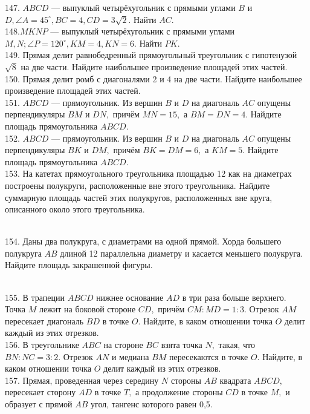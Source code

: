 147. $ABCD$ --- выпуклый четырёхугольник с прямыми углами $B$ и $D,\angle A=45^\circ, BC=4, CD=3\sqrt{2}.$ Найти $AC.$\\
148.$MKNP$ --- выпуклый четырёхугольник с прямыми углами $M, N; \angle P=120^\circ, KM=4, KN=6.$ Найти $PK.$\\
149. Прямая делит равнобедренный прямоугольный треугольник с гипотенузой $\sqrt{8}$ на две части. Найдите наибольшее произведение площадей этих частей.\\
150. Прямая делит ромб с диагоналями 2 и 4 на две части. Найдите наибольшее произведение площадей
этих частей.\\
151. $ABCD$ --- прямоугольник. Из вершин $B$ и $D$ на диагональ $AC$ опущены перпендикуляры $BM$ и $DN,$
причём $MN=15,$ а $BM=DN=4.$ Найдите площадь прямоугольника $ABCD.$\\
152. $ABCD$ --- прямоугольник. Из вершин $B$ и $D$ на диагональ $AC$ опущены перпендикуляры $BK$ и $DM,$ причём $BK=DM=6,$ а $KM=5.$ Найдите площадь прямоугольника $ABCD.$\\
153. На катетах прямоугольного треугольника площадью 12 как на диаметрах построены полукруги, расположенные вне этого треугольника. Найдите суммарную площадь частей этих полукругов, расположенных вне круга, описанного около этого треугольника.
\begin{figure}[h]
\end{figure}\\
154. Даны два полукруга, с диаметрами на одной прямой.
Хорда большего полукруга $AB$ длиной 12 параллельна диаметру и касается
меньшего полукруга. Найдите площадь закрашенной фигуры.
\begin{figure}[h]
\end{figure}\\
155. В трапеции $ABCD$ нижнее основание $AD$ в три раза больше верхнего. Точка $M$ лежит на боковой
стороне $CD,$ причём $CM:MD=1:3.$ Отрезок $AM$ пересекает диагональ $BD$ в точке $O.$ Найдите, в
каком отношении точка $O$ делит каждый из этих отрезков.\\
156. В треугольнике $ABC$ на стороне $BC$ взята точка $N,$ такая, что $BN : NC=3:2.$ Отрезок $AN$ и медиана
$BM$ пересекаются в точке $O.$ Найдите, в каком отношении точка $O$ делит каждый из этих отрезков.\\
157. Прямая, проведенная через середину $N$ стороны $AB$ квадрата $ABCD,$ пересекает сторону $AD$ в точке
$T,$ а продолжение стороны $CD$ в точке $M,$ и образует с прямой $AB$ угол, тангенс которого равен 0,5.
